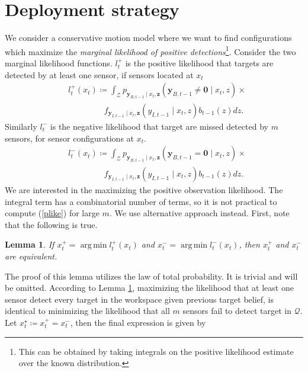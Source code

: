 \documentclass[journal]{IEEEtran}
\newtheorem{lemma}{Lemma}[section]
\DeclareMathOperator*{\argmin}{arg\,min}
\begin{document}
\section{Deployment strategy}
\label{sec:sec5}
We consider a conservative motion model where we want to find configurations which maximize the \emph{marginal likelihood of positive detections}\footnote{This can be obtained by taking integrals on the positive likelihood estimate over the known distribution.}.
Consider the two marginal likelihood functions. $l_t^{+}$ is the positive likelihood that targets are detected by at least one sensor, if sensors located at $x_t$ 
\begin{align}
&l_t^{+}(x_t)\coloneqq \int_{\mathcal{Z}}
p_{\bm{y}_{B,t-1}\mid x_t,\bm{z}}
\left(
\bm{y}_{B,t-1} \neq \bm{0}
\mid x_t,z
\right) \times \nonumber \\
&\,\,\,\,\,\,\,\,\,\,\,\,\,\,\,\,\,\,\,\,\,\,\,\,\,\,f_{\bm{y}_{I,t-1}\mid x_t,\bm{z}}
\left(
y_{I,t-1}
\mid x_t,z
\right) b_{t-1}(z) dz.
\label{plike}  
\end{align}
Similarly $l_t^{-}$ is the negative likelihood that target are missed detected by $m$ sensors, for sensor configurations at $x_t$.
\begin{align*}
&l_t^{-}(x_t)\coloneqq \int_{\mathcal{Z}}
p_{\bm{y}_{B,t-1}\mid x_t,\bm{z}}
\left(
\bm{y}_{B,t-1}= \bm{0}\mid x_t,z
\right)
 \times \\
&\,\,\,\,\,\,\,\,\,\,\,\,\,\,\,\,\,\,\,\,\,\,\,\,\,\,f_{\bm{y}_{I,t-1}\mid x_t,\bm{z}}
\left(
y_{I,t-1}
\mid x_t,z
\right) b_{t-1}(z)dz. 
\end{align*}
We are interested in the maximizing the positive observation likelihood. The integral term has a combinatorial number of terms,
so it is not practical to compute (\ref{plike}) for large $m$. We use alternative approach instead. First, note that the following is true.
\begin{lemma}
If $x_t^{+} = \argmin l_t^+(x_t)$ and $x_t^{-} = \argmin l_t^-(x_t)$, then $x_t^+$ and $x_t^-$ are equivalent.
\label{lem1}
\end{lemma}
The proof of this lemma utilizes the law of total probability. It is trivial and will be omitted.
According to Lemma \ref{lem1}, maximizing the likelihood that at least one sensor detect every target in the workspace given previous target belief, is identical to minimizing the likelihood that all $m$ sensors fail to detect target in $\mathcal{Q}$.
Let ${x}^{\star}_t \coloneqq x_t^+ = x_t^-$, then the final expression is given by
\end{document}
